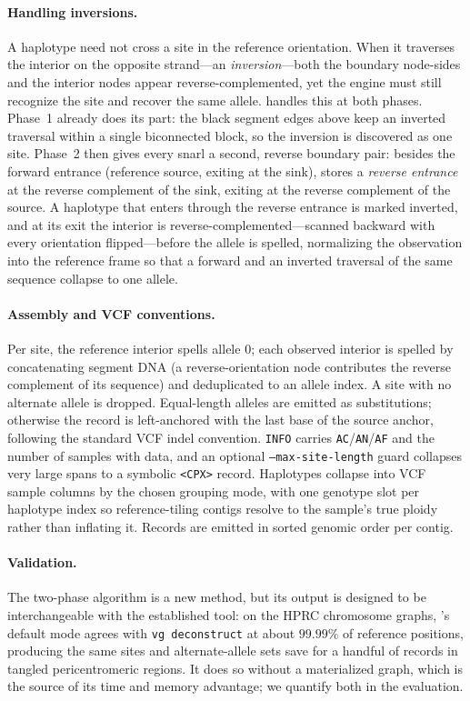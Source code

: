 \paragraph{Handling inversions.}
A haplotype need not cross a site in the reference orientation. When it traverses the
interior on the opposite strand---an \emph{inversion}---both the boundary node-sides
and the interior nodes appear reverse-complemented, yet the engine must still
recognize the site and recover the same allele. \gfaz handles this at both phases.
Phase~1 already does its part: the black segment edges above keep an inverted
traversal within a single biconnected block, so the inversion is discovered as one
site. Phase~2 then gives every snarl a second, reverse boundary pair: besides the forward entrance
(reference source, exiting at the sink), \gfaz stores a \emph{reverse entrance} at the
reverse complement of the sink, exiting at the reverse complement of the source. A
haplotype that enters through the reverse entrance is marked inverted, and at its exit
the interior is reverse-complemented---scanned backward with every orientation
flipped---before the allele is spelled, normalizing the observation into the reference
frame so that a forward and an inverted traversal of the same sequence collapse to one
allele.

\paragraph{Assembly and VCF conventions.}
Per site, the reference interior spells allele $0$; each observed interior is spelled
by concatenating segment DNA (a reverse-orientation node contributes the reverse
complement of its sequence) and deduplicated to an allele index. A site with no alternate allele is
dropped. Equal-length alleles are emitted as substitutions; otherwise the record is
left-anchored with the last base of the source anchor, following the standard VCF
indel convention. \texttt{INFO} carries \texttt{AC}/\texttt{AN}/\texttt{AF} and the
number of samples with data, and an optional \texttt{--max-site-length} guard
collapses very large spans to a symbolic \texttt{<CPX>} record. Haplotypes collapse
into VCF sample columns by the chosen grouping mode, with one genotype slot per
haplotype index so reference-tiling contigs resolve to the sample's true ploidy
rather than inflating it. Records are emitted in sorted genomic order per contig.

\paragraph{Validation.}
The two-phase algorithm is a new method, but its output is designed to be
interchangeable with the established tool: on the HPRC chromosome graphs, \gfaz's
default mode agrees with \texttt{vg deconstruct} at about $99.99\%$ of reference
positions, producing the same sites and alternate-allele sets save for a handful of
records in tangled pericentromeric regions. It does so without a materialized graph,
which is the source of its time and memory advantage; we quantify both in the
evaluation.

